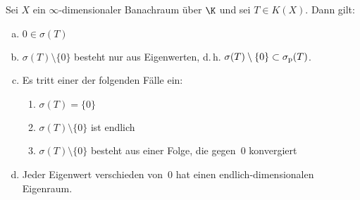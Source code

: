 \begin{thSatz} \label{vl21:spektralsatz}
    Sei $X$ ein $\infty$-dimensionaler Banachraum über $\K$ und sei $T\in K(X)$.
    Dann gilt:
    \begin{enumerate}[(a)]
        \item
            $0\in \sigma(T)$
        \item
            $\sigma(T)\setminus\{0\}$ besteht nur aus Eigenwerten, d.\,h.
            $\sigma(T)\setminus\{0\} \subset \sigma_{\mathrm p}(T)$.
        \item
            Es tritt einer der folgenden Fälle ein:
            \begin{enumerate}[(1),leftmargin=*,labelsep=1em]
                \item
                    $\sigma(T) = \{0\}$
                \item
                    $\sigma(T) \setminus \{0\}$ ist endlich
                \item
                    $\sigma(T) \setminus \{0\}$ besteht aus einer Folge,
                    die gegen~$0$ konvergiert
            \end{enumerate}
        \item
            Jeder Eigenwert verschieden von~$0$ hat einen endlich-dimensionalen Eigenraum.
    \end{enumerate}
\end{thSatz}
